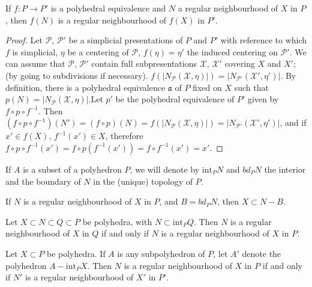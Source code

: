 \begin{proposition}\label{chap6-prop6.3.3}
If $f:P\to P'$ is a polyhedral equivalence and $N$ a regular neighbourhood of $X$ in $P$, then $f(N)$ is a regular neighbourhood of $f(X)$ in $P'$.
\end{proposition}

\begin{proof}
Let $\mathscr{P}$, $\mathscr{P}'$ be a simplicial presentations of $P$ and $P'$ with reference to which $f$ is simplicial, $\eta$ be a centering of $\mathscr{P}$, $f(\eta)=\eta'$ the induced centering on $\mathscr{P}'$. We can assume that $\mathscr{P}$, $\mathscr{P}'$ contain full subpresentations $\mathscr{X}$, $\mathscr{X}'$ covering $X$ and $X'$; (by going to subdivisions if necessary). $f(|N_{\mathscr{P}}(\mathscr{X},\eta)|)=|N_{\mathscr{P}'}(\mathscr{X}',\eta')|$. By definition, there is a polyhedral equivalence $\mathfrak{a}$ of $P$ fixed on $X$ such that $p(N)=|N_{\mathscr{P}}(\mathscr{X},\eta)|$.\pageoriginale Let $p'$ be the polyhedral equivalence of $P'$ given by $f\circ p\circ f^{-1}$. Then $(f\circ p\circ f^{-1})(N')=(f\circ p)(N)=f(|N_{\mathscr{P}}(\mathscr{X},\eta)|)=|N_{\mathscr{P}'}(\mathscr{X}',\eta')|$, and if $x'\in f(X)$, $f^{-1}(x')\in X$, therefore $f\circ p\circ f^{-1}(x')=f\circ p(f^{-1}(x'))=f\circ f^{-1}(x')=x'$.
\end{proof}

\begin{notation}\label{chap6-not6.3.4}
If $A$ is a subset of a polyhedron $P$, we will denote by $\text{int}_{P}N$ and $bd_{P}N$ the interior and the boundary of $N$ in the (unique) topology of $P$.
\end{notation}

\setcounter{proposition}{5}
\begin{ex}\label{chap6-ex6.3.6}
If $N$ is a regular neighbourhood of $X$ in $P$, and $B=bd_{P}N$, then $X\subset N-B$.
\end{ex}

\begin{ex}\label{chap6-ex6.3.7}
Let $X\subset N\subset Q\subset P$ be polyhedra, with $N\subset \text{int}_{P}Q$. Then $N$ is a regular neighbourhood of $X$ in $Q$ if and only if $N$ is a regular neighbourhood of $X$ in $P$.
\end{ex}

\begin{ex}\label{chap6-ex6.3.8}
Let $X\subset P$ be polyhedra. If $A$ is any subpolyhedron of $P$, let $A'$ denote the polyhedron $A-\text{int}_{P}X$. Then $N$ is a regular neighbourhood of $X$ in $P$ if and only if $N'$ is a regular neighbourhood of $X'$ in $P'$.
\end{ex}


